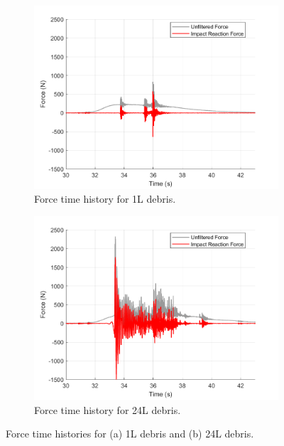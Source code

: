 \documentclass{article}
\begin{document}
\begin{figure}[h!]
    \centering
    \begin{subfigure}[b]{0.48\textwidth}
        \centering
        \includegraphics[width=\textwidth]{Reg_Lift_U_1_L_D__Masters_NHERIDeprisImpact2_goodtests_Reg_Lift_U_1_L_Trial04_Peak.png}
        \caption{Force time history for 1L debris.}
        \label{fig:timehist_1L_peak}
    \end{subfigure}
    \hfill
    \begin{subfigure}[b]{0.48\textwidth}
        \centering
        \includegraphics[width=\textwidth]{Reg_Lift_U_24_L_D__Masters_NHERIDeprisImpact2_goodtests_Reg_Lift_U_24_L_Trial04_Peak.png}
        \caption{Force time history for 24L debris.}
        \label{fig:timehist_24L_peak}
    \end{subfigure}
    \caption{Force time histories for (a) 1L debris and (b) 24L debris.}
    \label{fig:timehist_combined}
\end{figure}
\end{document}
